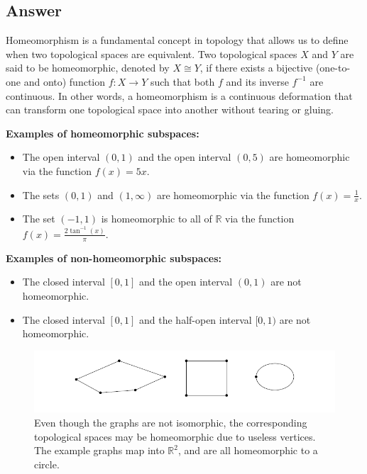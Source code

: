 \documentclass[12]{article}
\begin{document}
\subsection*{Answer}


Homeomorphism is a fundamental concept in topology that allows us to define when two topological spaces are equivalent. Two topological spaces $X$ and $Y$ are said to be homeomorphic, denoted by $X \cong Y$, if there exists a bijective (one-to-one and onto) function $f: X \to Y$ such that both $f$ and its inverse $f^{-1}$ are continuous. In other words, a homeomorphism is a continuous deformation that can transform one topological space into another without tearing or gluing.




\textbf{Examples of homeomorphic subspaces:}

\begin{itemize}
\item The open interval $(0,1)$ and the open interval $(0,5)$ are homeomorphic via the function $f(x) = 5x$.
\item The sets $(0,1)$ and $(1,\infty)$ are homeomorphic via the function $f(x) = \frac{1}{x}$.
\item The set $(-1,1)$ is homeomorphic to all of $\mathbb{R}$ via the function $f(x) = \frac{2 \tan^{-1}(x)}{\pi}$.
\end{itemize}

\textbf{Examples of non-homeomorphic subspaces:}

\begin{itemize}
\item The closed interval $[0,1]$ and the open interval $(0,1)$ are not homeomorphic.
\item The closed interval $[0,1]$ and the half-open interval $[0,1)$ are not homeomorphic.
\end{itemize}

\begin{figure}[h]
\centering
\includegraphics[scale=0.5]{images/homeomorphic_graphs_1.png}
\caption{Even though the graphs are not isomorphic, the corresponding topological spaces may be homeomorphic due to useless vertices. The example graphs map into $\mathbb{R}^2$, and are all homeomorphic to a circle.}
\label{fig:homeomorphic_graphs_1}
\end{figure}
\end{document}
